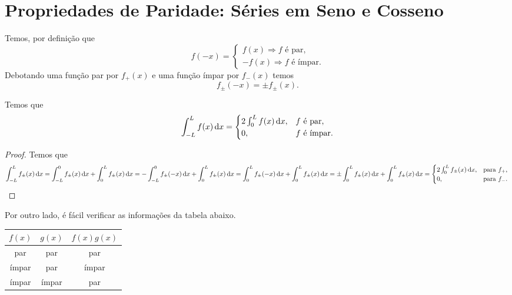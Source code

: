 \section{Propriedades de Paridade: Séries em Seno e Cosseno}
Temos, por definição que
\begin{dmath*}
  f(-x) = \begin{cases}
    f(x) \Rightarrow f \text{ é par}, \\
    -f(x) \Rightarrow f \text{ é ímpar}.
  \end{cases}
\end{dmath*}
Debotando uma função par por $f_+(x)$ e uma função ímpar por $f_-(x)$ temos
\begin{dmath*}
  f_\pm(-x) = \pm f_\pm(x).
\end{dmath*}

\begin{prop}
  Temos que
  \begin{dmath*}
    \int_{-L}^L f(x) \vi{x} = \begin{cases}
      2 \int_0^L f(x) \vi{x}, & f \text{ é par}, \\
      0, & f \text{ é ímpar}.
    \end{cases}
  \end{dmath*}
\end{prop}
\begin{proof}
  Temos que
  \begin{dmath*}
    \int_{-L}^L f_\pm(x) \vi{x} = \int_{-L}^0 f_\pm(x) \vi{x} + \int_0^L f_\pm(x) \vi{x}
    = -\int_{-L}^0 f_\pm(-x) \vi{x} + \int_0^L f_\pm(x) \vi{x}
    = \int_0^L f_\pm(-x) \vi{x} + \int_0^L f_\pm(x) \vi{x}
    = \pm \int_0^L f_\pm(x) \vi{x} + \int_0^L f_\pm(x) \vi{x}
    = \begin{cases}
      2 \int_0^L f_\pm(x) \vi{x}, & \text{para } f_+, \\
      0, & \text{para } f_-.
    \end{cases} \qedhere
  \end{dmath*}
\end{proof}

Por outro lado, é fácil verificar as informações da tabela abaixo.
\begin{table}[htb]
  \centering
  \begin{tabular}{|c|c|c|}
    \hline
    $f(x)$ & $g(x)$ & $f(x) g(x)$ \\ \hline
    par & par & par \\ \hline
    ímpar & par & ímpar \\ \hline
    ímpar & ímpar & par \\ \hline
  \end{tabular}
\end{table}

